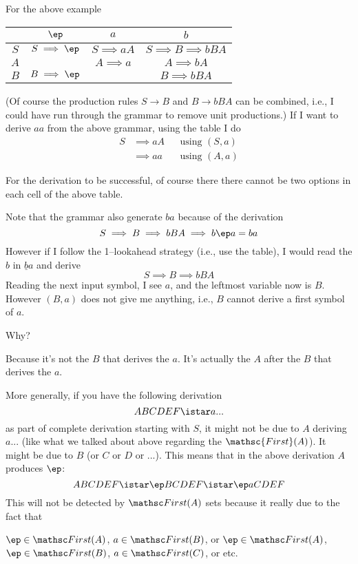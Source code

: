 For the above example
{\small
\begin{longtable}{|c||c|c|c|}
  \hline
    & $\ep$            & $a$             & $b$                 \\ \hline\hline
$S$ & $S \implies \ep$ & $S \implies aA$ & $S \implies B \implies bBA$ \\ \hline
$A$ &                  & $A \implies a$  & $A \implies bA$  \\ \hline
$B$ & $B \implies \ep$ &                 & $B \implies bBA$ \\ \hline
\end{longtable}
}
(Of course the production rules $S \rightarrow B$ and $B \rightarrow bBA$ can
be combined, i.e., I could have run through the grammar to remove unit productions.)
If I want to derive $aa$ from the above grammar,
using the table I do
\begin{align*}
  S
  &\implies aA & & \text{using $(S, a)$} \\
  &\implies aa & & \text{using $(A, a)$}
\end{align*}

For the derivation to be successful, of course there
there cannot be two options in each cell of the above table.

Note that the grammar also generate $ba$ because of the derivation
\[
S \implies B \implies bBA \implies b \ep a = ba
\]
However if I follow the 1--lookahead strategy (i.e., use the table),
I would read the $b$ in $\underline{b}a$ and derive 
\[
S \implies B \implies bBA
\]
Reading the next input symbol, I see $a$, and the leftmost variable now is $B$.
However $(B,a)$ does not give me anything, i.e., $B$ cannot derive a first symbol of $a$.

Why?

Because it's not the $B$ that derives the $a$.
It's actually the $A$ after the $B$ that derives the $a$.

More generally,
if you have the following derivation
\[
ABCDEF \istar a...
\]
as part of complete derivation starting with $S$,
it might not be due to $A$ deriving $a...$ (like what we talked about
above regarding the $\mathsc{First}(A)$).
It might be due to $B$ (or $C$ or $D$ or ...).
This means that in the above derivation $A$ produces $\ep$:
\[
ABCDEF \istar \ep BCDEF \istar \ep aCDEF
\]
This will not be detected by $\FIRST(A)$ sets
because it really due to the fact that
\begin{enumerate}[nosep]
  \li $\ep \in \FIRST(A)$, $a \in \FIRST(B)$, or
  \li $\ep \in \FIRST(A)$, $\ep \in \FIRST(B)$, $a \in \FIRST(C)$, or
  \li etc.
\end{enumerate}

